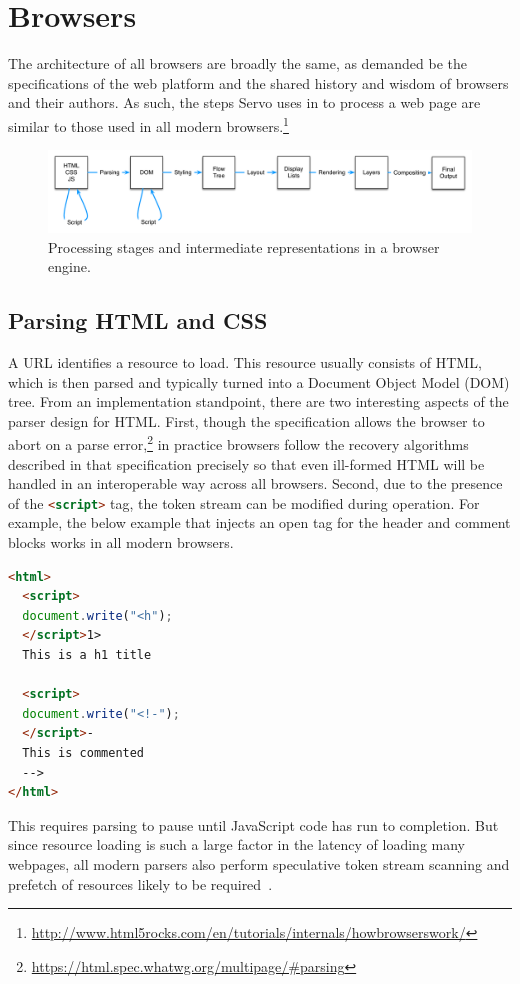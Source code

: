 
\section{Browsers}
\label{sec:browsers}

The architecture of all browsers are broadly the same, as demanded be the specifications of
the web platform and the shared history and wisdom of browsers and their authors.
As such, the steps Servo uses in  to process a web page
are similar to those used in all modern browsers.\footnote{\url{http://www.html5rocks.com/en/tutorials/internals/howbrowserswork/}}
\begin{figure}[ht]
  \begin{center}
    \includegraphics[scale=0.55]{pics/browser}
  \end{center}%
  \caption{Processing stages and intermediate representations in a browser engine.}
  \label{fig:browser}
\end{figure}%

\subsection{Parsing HTML and CSS}

A URL identifies a resource to load.
This resource usually consists of HTML, which is then parsed and typically turned into a Document Object
Model (DOM) tree.
From an implementation standpoint, there are two interesting aspects of the parser design
for HTML.
First, though the specification allows the browser to abort on a parse error,\footnote{\url{https://html.spec.whatwg.org/multipage/#parsing}}
in practice browsers follow the recovery algorithms described in that specification precisely so that
even ill-formed HTML will be handled in an interoperable way across all browsers.
Second, due to the presence of the \lstinline[language=HTML]{<script>} tag, the token stream can be modified
during operation.
For example, the below example that injects an open tag for the header and comment blocks works in all modern browsers.
\begin{lstlisting}[language=HTML]
<html>
  <script>
  document.write("<h");
  </script>1>
  This is a h1 title

  <script>
  document.write("<!-");
  </script>-
  This is commented
  -->
</html>
\end{lstlisting}
This requires parsing to pause until JavaScript code has run to completion.
But since resource loading is such a large factor in the latency of loading many webpages,
all modern parsers also perform speculative token stream scanning and prefetch of resources likely to be required~\cite{browsers-slow-smartphones}.

